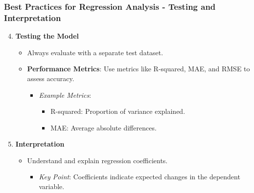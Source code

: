 \documentclass[aspectratio=169]{beamer}
\begin{document}
\begin{frame}[fragile]
    \frametitle{Best Practices for Regression Analysis - Testing and Interpretation}
    \begin{enumerate}
        \setcounter{enumi}{3}
        \item \textbf{Testing the Model}
        \begin{itemize}
            \item Always evaluate with a separate test dataset.
            \item \textbf{Performance Metrics}: Use metrics like R-squared, MAE, and RMSE to assess accuracy.
            \begin{itemize}
                \item \textit{Example Metrics}:
                \begin{itemize}
                    \item R-squared: Proportion of variance explained.
                    \item MAE: Average absolute differences.
                \end{itemize}
            \end{itemize}
        \end{itemize}
        
        \item \textbf{Interpretation}
        \begin{itemize}
            \item Understand and explain regression coefficients.
            \begin{itemize}
                \item \textit{Key Point}: Coefficients indicate expected changes in the dependent variable.
            \end{itemize}
        \end{itemize}
    \end{enumerate}
\end{frame}
\end{document}
